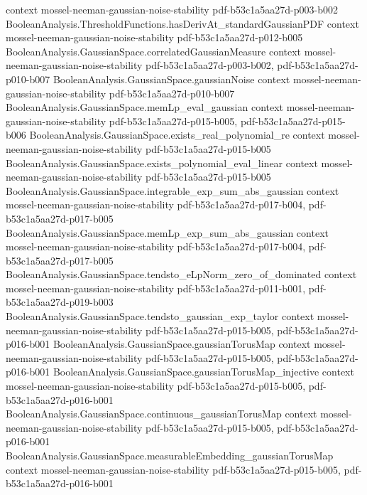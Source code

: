 \begin{theorem}
  {context}
  {mossel-neeman-gaussian-noise-stability}
  {pdf-b53c1a5aa27d-p003-b002}
\proofstep
  {BooleanAnalysis.ThresholdFunctions.hasDerivAt_standardGaussianPDF}
  {context}
  {mossel-neeman-gaussian-noise-stability}
  {pdf-b53c1a5aa27d-p012-b005}
\proofstep
  {BooleanAnalysis.GaussianSpace.correlatedGaussianMeasure}
  {context}
  {mossel-neeman-gaussian-noise-stability}
  {pdf-b53c1a5aa27d-p003-b002,
    pdf-b53c1a5aa27d-p010-b007}
\proofstep
  {BooleanAnalysis.GaussianSpace.gaussianNoise}
  {context}
  {mossel-neeman-gaussian-noise-stability}
  {pdf-b53c1a5aa27d-p010-b007}
\proofstep
  {BooleanAnalysis.GaussianSpace.memLp_eval_gaussian}
  {context}
  {mossel-neeman-gaussian-noise-stability}
  {pdf-b53c1a5aa27d-p015-b005,
    pdf-b53c1a5aa27d-p015-b006}
\proofstep
  {BooleanAnalysis.GaussianSpace.exists_real_polynomial_re}
  {context}
  {mossel-neeman-gaussian-noise-stability}
  {pdf-b53c1a5aa27d-p015-b005}
\proofstep
  {BooleanAnalysis.GaussianSpace.exists_polynomial_eval_linear}
  {context}
  {mossel-neeman-gaussian-noise-stability}
  {pdf-b53c1a5aa27d-p015-b005}
\proofstep
  {BooleanAnalysis.GaussianSpace.integrable_exp_sum_abs_gaussian}
  {context}
  {mossel-neeman-gaussian-noise-stability}
  {pdf-b53c1a5aa27d-p017-b004,
    pdf-b53c1a5aa27d-p017-b005}
\proofstep
  {BooleanAnalysis.GaussianSpace.memLp_exp_sum_abs_gaussian}
  {context}
  {mossel-neeman-gaussian-noise-stability}
  {pdf-b53c1a5aa27d-p017-b004,
    pdf-b53c1a5aa27d-p017-b005}
\proofstep
  {BooleanAnalysis.GaussianSpace.tendsto_eLpNorm_zero_of_dominated}
  {context}
  {mossel-neeman-gaussian-noise-stability}
  {pdf-b53c1a5aa27d-p011-b001,
    pdf-b53c1a5aa27d-p019-b003}
\proofstep
  {BooleanAnalysis.GaussianSpace.tendsto_gaussian_exp_taylor}
  {context}
  {mossel-neeman-gaussian-noise-stability}
  {pdf-b53c1a5aa27d-p015-b005,
    pdf-b53c1a5aa27d-p016-b001}
\proofstep
  {BooleanAnalysis.GaussianSpace.gaussianTorusMap}
  {context}
  {mossel-neeman-gaussian-noise-stability}
  {pdf-b53c1a5aa27d-p015-b005,
    pdf-b53c1a5aa27d-p016-b001}
\proofstep
  {BooleanAnalysis.GaussianSpace.gaussianTorusMap_injective}
  {context}
  {mossel-neeman-gaussian-noise-stability}
  {pdf-b53c1a5aa27d-p015-b005,
    pdf-b53c1a5aa27d-p016-b001}
\proofstep
  {BooleanAnalysis.GaussianSpace.continuous_gaussianTorusMap}
  {context}
  {mossel-neeman-gaussian-noise-stability}
  {pdf-b53c1a5aa27d-p015-b005,
    pdf-b53c1a5aa27d-p016-b001}
\proofstep
  {BooleanAnalysis.GaussianSpace.measurableEmbedding_gaussianTorusMap}
  {context}
  {mossel-neeman-gaussian-noise-stability}
  {pdf-b53c1a5aa27d-p015-b005,
    pdf-b53c1a5aa27d-p016-b001}

\end{theorem}

